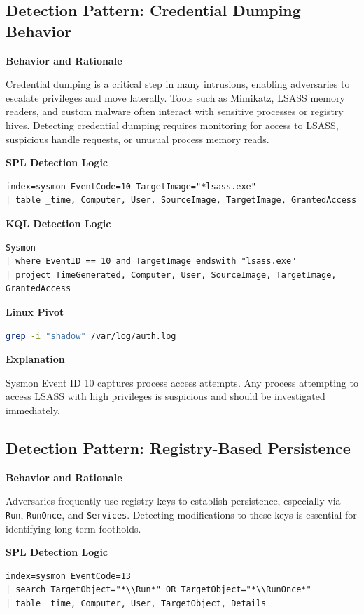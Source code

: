 \subsection*{Detection Pattern: Credential Dumping Behavior}

\textbf{Behavior and Rationale}

Credential dumping is a critical step in many intrusions, enabling adversaries to escalate privileges and move laterally. Tools such as Mimikatz, LSASS memory readers, and custom malware often interact with sensitive processes or registry hives. Detecting credential dumping requires monitoring for access to LSASS, suspicious handle requests, or unusual process memory reads.

\textbf{SPL Detection Logic}
\begin{lstlisting}
index=sysmon EventCode=10 TargetImage="*lsass.exe"
| table _time, Computer, User, SourceImage, TargetImage, GrantedAccess
\end{lstlisting}

\textbf{KQL Detection Logic}
\begin{lstlisting}
Sysmon
| where EventID == 10 and TargetImage endswith "lsass.exe"
| project TimeGenerated, Computer, User, SourceImage, TargetImage, GrantedAccess
\end{lstlisting}

\textbf{Linux Pivot}
\begin{lstlisting}[language=bash]
grep -i "shadow" /var/log/auth.log
\end{lstlisting}

\textbf{Explanation}

Sysmon Event ID 10 captures process access attempts. Any process attempting to access LSASS with high privileges is suspicious and should be investigated immediately.

\subsection*{Detection Pattern: Registry-Based Persistence}

\textbf{Behavior and Rationale}

Adversaries frequently use registry keys to establish persistence, especially via \texttt{Run}, \texttt{RunOnce}, and \texttt{Services}. Detecting modifications to these keys is essential for identifying long-term footholds.

\textbf{SPL Detection Logic}
\begin{lstlisting}
index=sysmon EventCode=13
| search TargetObject="*\\Run*" OR TargetObject="*\\RunOnce*"
| table _time, Computer, User, TargetObject, Details
\end{lstlisting}

